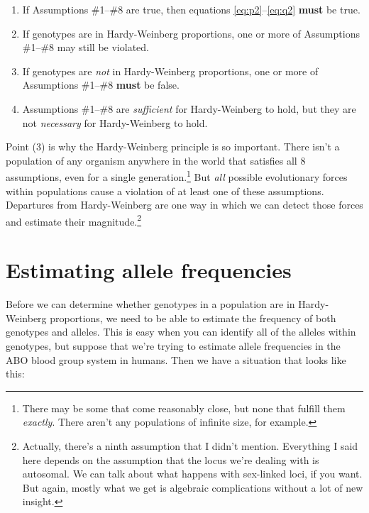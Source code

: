 \documentclass[12pt]{article}
\begin{document}
\begin{enumerate}

\item If Assumptions \#1--\#8 are true, then equations
  \ref{eq:p2}--\ref{eq:q2} {\bf must} be true.

\item If genotypes are in Hardy-Weinberg proportions, one or more of
  Assumptions \#1--\#8 may still be violated. 

\item If genotypes are {\it not\/} in Hardy-Weinberg proportions, one
  or more of Assumptions \#1--\#8 {\bf must} be false.

\item Assumptions \#1--\#8 are {\it sufficient\/} for Hardy-Weinberg
  to hold, but they are not {\it necessary\/} for Hardy-Weinberg to
  hold. 

\end{enumerate}

Point (3) is why the Hardy-Weinberg principle is so important. There
isn't a population of any organism anywhere in the world that
satisfies all 8 assumptions, even for a single
generation.\footnote{There may be some that come reasonably close, but
  none that fulfill them {\it exactly}. There aren't any populations
  of infinite size, for example.}  But {\it all\/} possible
evolutionary forces within populations cause a violation of at least
one of these assumptions. Departures from Hardy-Weinberg are one way
in which we can detect those forces and estimate their
magnitude.\footnote{Actually, there's a ninth assumption that I didn't
  mention. Everything I said here depends on the assumption that the
  locus we're dealing with is autosomal. We can talk about what
  happens with sex-linked loci, if you want. But again, mostly what we
  get is algebraic complications without a lot of new insight.}

\section*{Estimating allele frequencies}

Before we can determine whether genotypes in a population are in
Hardy-Weinberg proportions, we need to be able to estimate the
frequency of both genotypes and alleles. This is easy when you can
identify all of the alleles within genotypes, but suppose that we're
trying to estimate allele frequencies in the ABO blood group system in
humans. Then we have a situation that looks like this:
\end{document}
